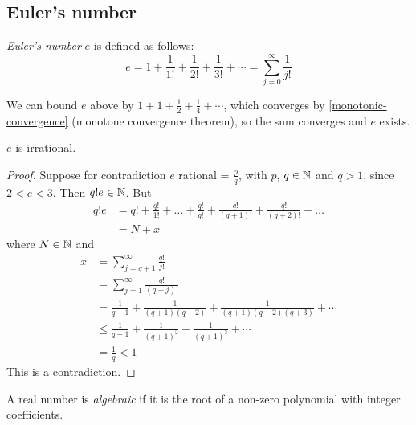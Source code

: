 \documentclass{../../template/note}
\begin{document}
    \subsection{Euler's number}
    
    \begin{definition}
        \emph{Euler's number} \(e\) is defined as follows:
        \[
            e = 1 + \frac{1}{1!} + \frac{1}{2!} + \frac{1}{3!} + \cdots = \sum_{j=0}^\infty \frac{1}{j!}
        \]
    \end{definition}
    
    \begin{remark*}
        We can bound \(e\) above by \(1 + 1 + \frac{1}{2} + \frac{1}{4} + \cdots\), which converges by \cref{monotonic-convergence} (monotone convergence theorem), so the sum converges and \(e\) exists.
    \end{remark*}
    
    \begin{proposition}
        \(e\) is irrational.
    \end{proposition}
    
    \begin{proof}
        Suppose for contradiction \(e\) rational = \(\frac{p}{q}\), with \(p\), \(q \in \mathbb N\) and \(q > 1\), since \(2 < e < 3\). Then \(q!e \in \mathbb N\). But
        \begin{align*}
            q!e &= q! + \frac{q!}{1!} + \dots + \frac{q!}{q!} + \frac{q!}{(q+1)!} + \frac{q!}{(q+2)!} + \dots \\ 
            &= N + x
        \end{align*}
        where \(N \in \mathbb N\) and
        \begin{align*}
            x &= \sum_{j=q+1}^\infty \frac{q!}{j!} \\
            &= \sum_{j=1}^\infty \frac{q!}{(q+j)!} \\
            &= \frac{1}{q+1} + \frac{1}{(q+1)(q+2)} + \frac{1}{(q+1)(q+2)(q+3)} + \cdots \\
            &\leq \frac{1}{q+1} + \frac{1}{(q+1)^2} + \frac{1}{(q+1)^3} + \cdots \\
            &= \frac{1}{q} < 1
        \end{align*}
        This is a contradiction.
    \end{proof}
    
    \begin{definition}
        A real number is \emph{algebraic} if it is the root of a non-zero polynomial with integer coefficients.
    \end{definition}
    
\end{document}
